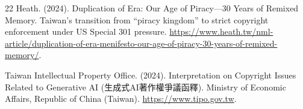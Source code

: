 \documentclass[11pt,a4paper]{article}
\begin{document}
\begin{thebibliography}{22}
Heath. (2024).
\newblock Duplication of Era: Our Age of Piracy---30 Years of Remixed Memory.
\newblock Taiwan's transition from ``piracy kingdom'' to strict copyright enforcement under US Special 301 pressure.
\newblock \url{https://www.heath.tw/nml-article/duplication-of-era-menifesto-our-age-of-piracy-30-years-of-remixed-memory/}.

Taiwan Intellectual Property Office. (2024).
\newblock Interpretation on Copyright Issues Related to Generative AI (生成式AI著作權爭議函釋).
\newblock Ministry of Economic Affairs, Republic of China (Taiwan).
\newblock \url{https://www.tipo.gov.tw}.

\end{thebibliography}
\end{document}
